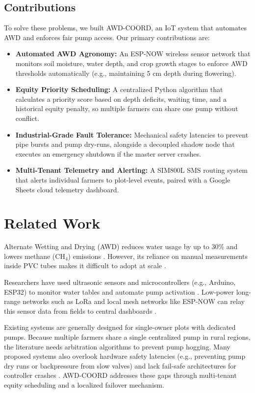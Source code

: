 \documentclass[conference]{IEEEtran}
\begin{document}
\subsection{Contributions}
To solve these problems, we built AWD-COORD, an IoT system that automates AWD and enforces fair pump access. Our primary contributions are:
\begin{itemize}
    \item \textbf{Automated AWD Agronomy:} An ESP-NOW wireless sensor network that monitors soil moisture, water depth, and crop growth stages to enforce AWD thresholds automatically (e.g., maintaining 5 cm depth during flowering).
    \item \textbf{Equity Priority Scheduling:} A centralized Python algorithm that calculates a priority score based on depth deficits, waiting time, and a historical equity penalty, so multiple farmers can share one pump without conflict.
    \item \textbf{Industrial-Grade Fault Tolerance:} Mechanical safety latencies to prevent pipe bursts and pump dry-runs, alongside a decoupled shadow node that executes an emergency shutdown if the master server crashes.
    \item \textbf{Multi-Tenant Telemetry and Alerting:} A SIM800L SMS routing system that alerts individual farmers to plot-level events, paired with a Google Sheets cloud telemetry dashboard.
\end{itemize}

\section{Related Work}
Alternate Wetting and Drying (AWD) reduces water usage by up to 30\% and lowers methane (CH$_4$) emissions \cite{lampayan2015}. However, its reliance on manual measurements inside PVC tubes makes it difficult to adopt at scale \cite{irri_awd}.

Researchers have used ultrasonic sensors and microcontrollers (e.g., Arduino, ESP32) to monitor water tables and automate pump activation \cite{iot_awd_ieee}. Low-power long-range networks such as LoRa and local mesh networks like ESP-NOW can relay this sensor data from fields to central dashboards \cite{espnow_wsn}.

Existing systems are generally designed for single-owner plots with dedicated pumps. Because multiple farmers share a single centralized pump in rural regions, the literature needs arbitration algorithms to prevent pump hogging. Many proposed systems also overlook hardware safety latencies (e.g., preventing pump dry runs or backpressure from slow valves) and lack fail-safe architectures for controller crashes \cite{safety_iot}. AWD-COORD addresses these gaps through multi-tenant equity scheduling and a localized failover mechanism.
\end{document}
